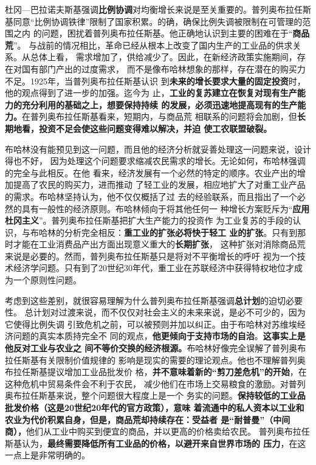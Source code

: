 杜冈—巴拉诺夫斯基强调\textbf{比例协调}对均衡增长来说是至关重要的。普列奥布拉任斯
基同意“比例协调铁律”限制了国家积累。的确，确保比例失调被限制在可管理的范围之内
的问题，困扰着普列奥布拉任斯基。他正确地认识到主要的困难在于“\textbf{商品荒}”。
与战前的情况相比，革命已经从根本上改变了国内生产的工业品的供求关系。从总体上看，
需求增加了，供给减少了。因此，在新经济政策实施期间，存在对国有部门产出的过度需求，
而不是像布哈林想象的那样，存在潜在的购买力不足。1925年，当普列奥布拉任斯基认识
到\textbf{未来的增长要求大量的固定投资}时，他的观点得到了进一步的加强。迄今为
止，\textbf{工业的复苏建立在恢复对现有生产能力的充分利用的基础之上，想要保持持续
  的发展，必须迅速地提高现有的生产能力。}在普列奥布拉任斯基看来，短期内，与商品荒
相联系的问题将会加剧，但\textbf{长期地看，投资不足会使这些问题变得难以解决，并迫
  使工农联盟破裂。}

布哈林没有能预见到这一问题，而且他的经济分析就妥善处理这一问题来说，设计得也不好，
因为处理这个问题要求缩减农民需求的增长。无论如何，布哈林强调的完全与此相反。在他
看来，经济发展有一个必然的特定的顺序。农业产出的增加提高了农民的购买力，进而推动
了轻工业的发展，相应地扩大了对重工业产品的需求。布哈林坚持认为，他不仅仅概括了过
去的经验联系，而且指出了一个必然的具有一般性的经济原则。布哈林倾向于将其他任何一
种增长方案贬斥为“\textbf{应用杜冈主义}”。普列奥布拉任斯基把扩大生产能力的投资作
为工业复苏的手段的认识，与布哈林的分析完全相反：\textbf{重工业的扩张必将快于轻工
  业的扩张}。只有到那时才能在工业消费品产出方面出现意义重大的\textbf{长期扩张}，
这种扩张对消除商品荒来说是必要的。然而，普列奥布拉任斯基只是将对不平衡增长的呼吁
视为一个技术经济学问题。只有到了20世纪30年代，重工业在苏联经济中获得特权地位才成
为一个原则性问题。

考虑到这些差别，就很容易理解为什么普列奥布拉任斯基强调\textbf{总计划}的迫切必要性。
总计划对过渡来说，而不仅仅对社会主义的未来来说，是必不可少的，因为它使得比例失调
引致危机之前，可以被预则并加以纠正。由于布哈林对苏维埃经济问题的真实本质持完全不
同的观点，\textbf{他更倾向于支持市场的自治}。\textbf{这事实上是他反对工业与农业之
  间不等价交换的经济根源。}布哈林好像完全误解了普列奥布拉任斯基有关限制价值规律的
影响是现实的需要的理论观点。他也不理解普列奥布拉任斯基提议增加工业品批发价
格，\textbf{并不意味着新的“剪刀差危机”的开始}，在这种危机中贸易条件会不利于农民，
减少他们在市场上交易粮食的激励。对普列奥布拉任斯基来说，整个问题很大程度上是一个
务实的问题。\textbf{保持较低的工业品批发价格（这是20世纪20年代的官方政策），意味
  着流通中的私人资本以工业和农业为代价积累自身，但是，商品荒却持续存在：受益者
  是“耐普曼”（中间商），}他们从工业中购买到便宜的商品，并以更高的价格卖给农民。
普列奥布拉任斯基认为，\textbf{最终需要降低所有工业品的价格，以避开来自世界市场的
  压力}，在这一点上是非常明确的。

